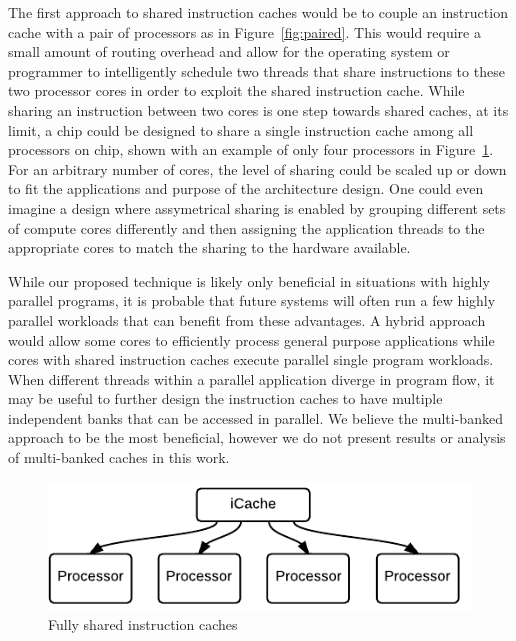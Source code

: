 The first approach to shared instruction caches would be to couple an
instruction cache with a pair of processors as in
Figure~\ref{fig:paired}. 
This would require a small amount of routing overhead and allow for the
operating system or programmer to intelligently schedule two threads 
that share instructions to these two processor cores in order to exploit 
the shared instruction cache.
While sharing an instruction between two cores is one step towards shared
caches, at its limit, a chip could be designed to share a single instruction
cache among all processors on chip, shown with an example of only four
processors in Figure~\ref{fig:shared}.
For an arbitrary number of cores, the level of sharing could be
scaled up or down to fit the applications and purpose of the
architecture design.
One could even imagine a design where assymetrical sharing is enabled
by grouping different sets of compute cores differently and then
assigning the application threads to the appropriate cores to match
the sharing to the hardware available.

While our proposed technique is likely only beneficial in situations
with highly parallel programs, it is probable that future systems will
often run a few highly parallel workloads that can benefit from these
advantages. 
A hybrid approach would allow some cores to efficiently process general 
purpose applications while cores with shared instruction caches execute
parallel single program workloads.
When different threads within a parallel application diverge in program flow,
it may be useful to further design the instruction caches to have multiple
independent banks that can be accessed in parallel.
We believe the multi-banked approach to be the most beneficial, however we do not 
present results or analysis of multi-banked caches in this work. 


\begin{figure}[ht!]
\centering
\includegraphics[width=\columnwidth]{graphics/SharedCaches}
\caption{Fully shared instruction caches}
\label{fig:shared}
\end{figure}



